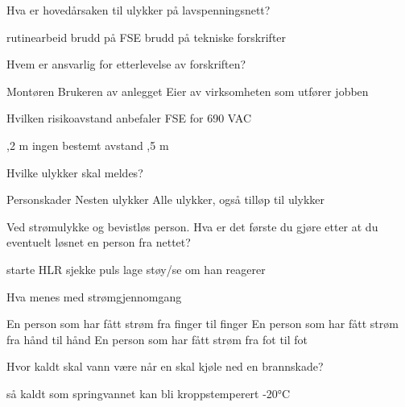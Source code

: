 \documentclass{exam}
\begin{document}
\begin{questions}
	\question Hva er hovedårsaken til ulykker på lavspenningsnett?
		\begin{oneparcheckboxes}
			\choice rutinearbeid
			\choice brudd på FSE
			\choice brudd på tekniske forskrifter
		\end{oneparcheckboxes}

	\question Hvem er ansvarlig for etterlevelse av forskriften?
		\begin{oneparcheckboxes}
			\choice Montøren
			\choice Brukeren av anlegget
			\choice Eier av virksomheten som utfører jobben
		\end{oneparcheckboxes}
		
	\question Hvilken risikoavstand anbefaler FSE for 690 VAC
		\begin{oneparcheckboxes}
			\choice 1,2 m
			\choice ingen bestemt avstand
			\choice 0,5 m
		\end{oneparcheckboxes}
		
	\question Hvilke ulykker skal meldes?
		\begin{oneparcheckboxes}
			\choice Personskader
			\choice Nesten ulykker
			\choice Alle ulykker, også tilløp til ulykker
		\end{oneparcheckboxes}
		
	\question Ved strømulykke og bevistløs person. Hva er det første du gjøre etter at du eventuelt løsnet en person fra nettet?
		\begin{oneparcheckboxes}
			\choice starte HLR
			\choice sjekke puls
			\choice lage støy/se om han reagerer
		\end{oneparcheckboxes}
		
	\question Hva menes med strømgjennomgang
		\begin{oneparcheckboxes}
			\choice En person som har fått strøm fra finger til finger
			\choice En person som har fått strøm fra hånd til hånd
			\choice En person som har fått strøm fra fot til fot
			\choice 
		\end{oneparcheckboxes}
		
	\question Hvor kaldt skal vann være når en skal kjøle ned en brannskade?
		\begin{oneparcheckboxes}
			\choice så kaldt som springvannet kan bli
			\choice kroppstemperert
			5-20°C
		\end{oneparcheckboxes}


\end{questions}
\end{document}
